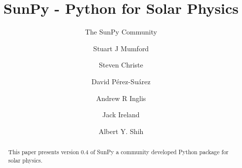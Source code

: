 \documentclass[12pt]{iopart}
\begin{document}
\title{SunPy - Python for Solar Physics}

\author{The SunPy Community}
\address{\url{http://sunpy.org}}

\author{Stuart J Mumford}
\address{Solar Physics \& Space Plasma Research Centre (SP$^{2}$RC), School of 
Mathematics and Statistics, The University of Sheffield, Hicks Building, 
Hounsfield Road, Sheffield, S3 7RH U.K.}

\author{Steven Christe}\
\address{NASA Goddard Space Flight Center, Greenbelt, U.S.A.}

\author{David P\'erez-Su\'arez}
\address{South African National Space Agency - Space Science,
Hospital Street, 7200 Hermanus, Western Cape, South Africa}

\author{Andrew R Inglis}
\address{NASA Goddard Space Flight Center, Greenbelt, USA}
\address{The Catholic University of America, Washington, DC, USA}

\author{Jack Ireland}
\address{ADNET Systems Inc., Mail Code 671.1, NASA Goddard Space
  Flight Center, Greenbelt, MD, U.S.A.}

\author{Albert Y. Shih}
\address{NASA Goddard Space Flight Center, Greenbelt, MD, USA}

\begin{abstract}
This paper presents version 0.4 of SunPy a community developed Python package 
for solar physics.

\end{abstract}

\maketitle


\label{sec:Intro}


\label{sec:DataTypes}


\label{sec:retrieval}


\label{sec:util}


\label{sec:ssw}


\label{sec:dev}


\label{sec:future}


{}
\end{document}
